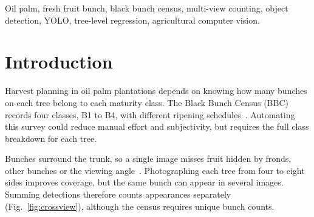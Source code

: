 \documentclass[conference,a4paper]{IEEEtran}
\begin{document}
\maketitle

\begin{abstract}
Oil palm harvest planning requires a per-tree count of bunches in each maturity
class. Multi-view imaging reduces occlusion, but the same bunch reappears across
photographs, so detections must be aggregated into unique counts. We compare
five regression counters and eight feature sets on SawitMVC (953 trees, 3,992
images), using ground-truth (GT) detections and a fixed YOLO26m detector. The
best observed class-level accuracies within one bunch are 98.05 and 77.48
percent, respectively; the corresponding tree-level accuracies are 92.20 and
32.62 percent. The class-level gap is 20.57 percentage points (95 percent
confidence interval 17.20 to 23.94), whereas no fixed-input counter pair
differs significantly after multiplicity correction. Diagnostic matching finds
22.7 percent of test bunches undetected in every view, alongside substantial maturity
confusion. The GT advantage persists in matched cross-validation, four YOLO26
checkpoints and a separately trained YOLO11m, whose matched-counter gap is
23.94 points. These results support prioritising detector output quality on
this dataset. They do not establish a ceiling on counter improvement, and
the diagnostic rules do not provide an additive decomposition of deployed error.

\end{abstract}
\begin{IEEEkeywords}
Oil palm, fresh fruit bunch, black bunch census, multi-view counting, object
detection, YOLO, tree-level regression, agricultural computer vision.
\end{IEEEkeywords}

\section{Introduction}
Harvest planning in oil palm plantations depends on knowing how many bunches
on each tree belong to each maturity class. The Black Bunch Census (BBC)
records four classes, B1 to B4, with different ripening schedules~\cite{ref12}. Automating this survey could reduce manual effort
and subjectivity, but requires the full class breakdown for each tree.

Bunches surround the trunk, so a single image misses fruit hidden by fronds,
other bunches or the viewing angle~\cite{ref1}. Photographing each tree from
four to eight sides improves coverage, but the same bunch can appear in several
images. Summing detections therefore counts appearances separately
(Fig.~\ref{fig:crossview}), although the census requires unique bunch counts.
\end{document}
